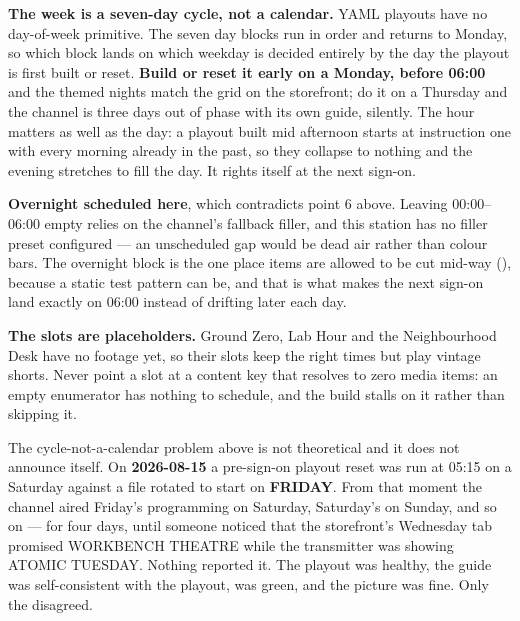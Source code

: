 \documentclass[fontpath=fonts/,logopath=logo/]{riposte-doc}
\begin{document}
\begin{ripbullets}
\item \textbf{The week is a seven-day cycle, not a calendar.} YAML playouts have no day-of-week primitive. The seven day blocks run in order and  returns to Monday, so which block lands on which weekday is decided entirely by the day the playout is first built or reset. \textbf{Build or reset it early on a Monday, before 06:00} and the themed nights match the grid on the storefront; do it on a Thursday and the channel is three days out of phase with its own guide, silently. The hour matters as well as the day: a playout built mid afternoon starts at instruction one with every morning  already in the past, so they collapse to nothing and the evening stretches to fill the day. It rights itself at the next sign-on.
\item \textbf{Overnight  scheduled here}, which contradicts point 6 above. Leaving 00:00–06:00 empty relies on the channel's fallback filler, and this station has no filler preset configured — an unscheduled gap would be dead air rather than colour bars. The overnight block is the one place items are allowed to be cut mid-way (), because a static test pattern can be, and that is what makes the next sign-on land exactly on 06:00 instead of drifting later each day.
\item \textbf{The  slots are placeholders.} Ground Zero, Lab Hour and the Neighbourhood Desk have no footage yet, so their slots keep the right times but play vintage shorts. Never point a slot at a content key that resolves to zero media items: an empty enumerator has nothing to schedule, and the build stalls on it rather than skipping it.
\end{ripbullets}



The cycle-not-a-calendar problem above is not theoretical and it does not announce itself. On \textbf{2026-08-15} a pre-sign-on playout reset was run at 05:15 on a Saturday against a file rotated to start on \textbf{FRIDAY}. From that moment the channel aired Friday's programming on Saturday, Saturday's on Sunday, and so on — for four days, until someone noticed that the storefront's Wednesday tab promised WORKBENCH THEATRE while the transmitter was showing ATOMIC TUESDAY. Nothing reported it. The playout was healthy, the guide was self-consistent with the playout,  was green, and the picture was fine. Only the  disagreed.
\end{document}

